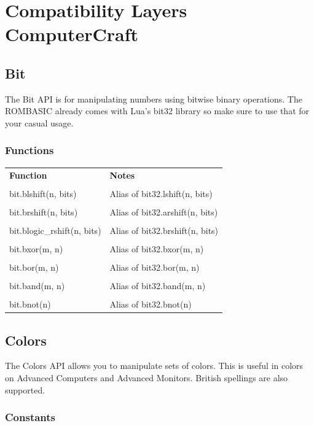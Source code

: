 \documentclass[10pt, stock]{memoir}
\let\oldsection\section
\renewcommand\section{\clearpage\oldsection}
\begin{document}
\chapter[Compatibility Layers---ComputerCraft]{{\LARGE Compatibility Layers} \\ ComputerCraft}

\section{Bit}

The Bit API is for manipulating numbers using bitwise binary operations. The ROMBASIC already comes with Lua's bit32 library so make sure to use that for your casual usage.

\subsection{Functions}

\begin{tabularx}{\textwidth}{l X}
	\textbf{\large Function} & \textbf{\large Notes}
	\\ \\
	\endhead
	bit.blshift(n, bits) & Alias of bit32.lshift(n, bits)
	\\ \\
	bit.brshift(n, bits) & Alias of bit32.arshift(n, bits)
	\\ \\
	bit.blogic\_rshift(n, bits) & Alias of bit32.brshift(n, bits)
	\\ \\
	bit.bxor(m, n) & Alias of bit32.bxor(m, n)
	\\ \\
	bit.bor(m, n) & Alias of bit32.bor(m, n)
	\\ \\
	bit.band(m, n) & Alias of bit32.band(m, n)
	\\ \\
	bit.bnot(n) & Alias of bit32.bnot(n)
\end{tabularx}

\section{Colors}

The Colors API allows you to manipulate sets of colors. This is useful in colors on Advanced Computers and Advanced Monitors. British spellings are also supported.

\subsection{Constants}
\end{document}

